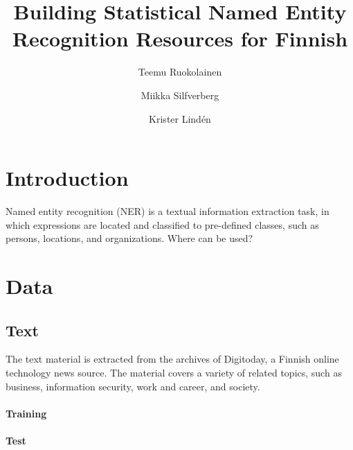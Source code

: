 \documentclass[11pt]{article}
\begin{document}
\title{Building Statistical Named Entity Recognition Resources for Finnish}
\author{Teemu Ruokolainen \and Miikka Silfverberg \and Krister Lind\'en}



\maketitle


\begin{abstract}
\noindent 

\end{abstract}

\section{Introduction}
\label{sec: introduction}

Named entity recognition (NER) is a textual information extraction task, in which expressions are located and classified to pre-defined classes, such as persons, locations, and organizations. Where can be used?





\section{Data}
\label{sec: data}

\subsection{Text}

The text material is extracted from the archives of Digitoday, a Finnish online technology news source. The material covers a variety of related topics, such as business, information security, work and career, and society.  


\paragraph{Training}

  

\paragraph{Test}
\end{document}
